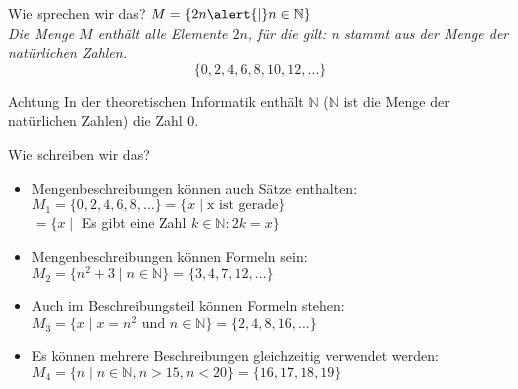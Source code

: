 %
%
%
%

\begin{frame}[fragile]{Wie sprechen wir das?}
    $M = \{2n \alert{\mid} n \in \mathbb{N}\}$ \\

    \emph{Die Menge $M$ enthält alle Elemente $2n$, \alert{für die gilt}: n stammt aus der Menge der natürlichen Zahlen.}
    \vspace{5pt}
    $$
        \{0, 2, 4, 6, 8, 10, 12, \dots \}
    $$

    \begin{alertblock}{Achtung}
        In der theoretischen Informatik enthält $\mathbb{N}$ ($\mathbb{N}$ ist die Menge der natürlichen Zahlen) die Zahl 0.
    \end{alertblock}

\end{frame}


\begin{frame}[fragile]{Wie schreiben wir das?}
    \begin{itemize}[<+->]
        \item Mengenbeschreibungen können auch Sätze enthalten:
              $M_1 = \{0,2,4,6,8,\dots\} = \{x \mid \text{x ist gerade}\}$\\
              \hspace{4.5mm}$= \{x \mid$ Es gibt eine Zahl $k \in \mathbb{N} : 2k = x\}$\\

        \item Mengenbeschreibungen können Formeln sein:
              $M_2 = \{n^2+3 \mid n \in \mathbb{N}\} = \{3, 4, 7, 12, \dots\}$

        \item Auch im Beschreibungsteil können Formeln stehen:
              $M_3 = \{x \mid x = n^2 \text{ und } n\in \mathbb{N}\} = \{2, 4, 8, 16, \dots\}$

        \item Es können mehrere Beschreibungen gleichzeitig verwendet werden:
              $M_4 = \{n \mid n \in \mathbb{N}, n > 15, n < 20\} = \{16, 17, 18, 19\}$\\

    \end{itemize}
\end{frame}

